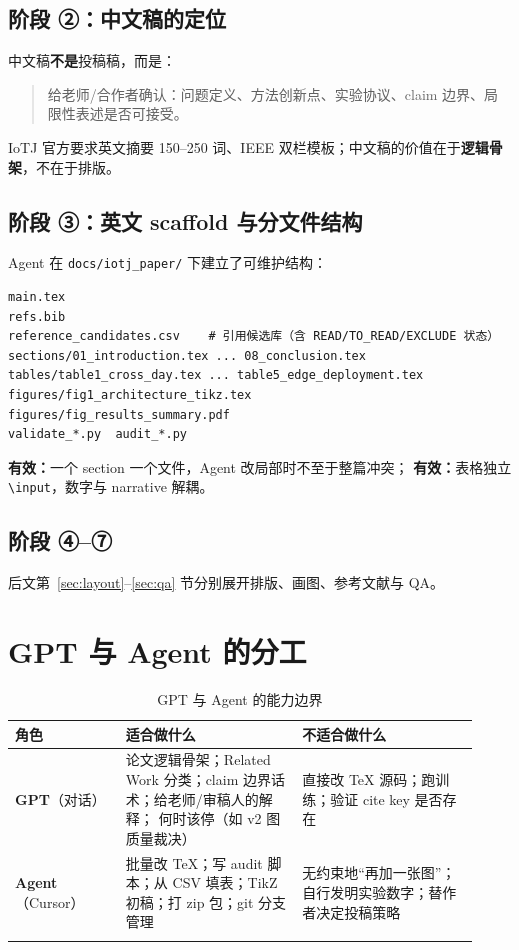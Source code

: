 \documentclass[11pt,a4paper]{ctexart}
\newcommand{\paperdir}{\texttt{docs/iotj\_paper/}}
\newcommand{\agent}{\textbf{Agent}}
\newcommand{\gpt}{\textbf{GPT}}
\newcommand{\good}[1]{\textcolor{green!50!black}{\textbf{有效：}#1}}
\begin{document}
\subsection{阶段 ②：中文稿的定位}
中文稿\textbf{不是}投稿稿，而是：
\begin{quote}
  给老师/合作者确认：问题定义、方法创新点、实验协议、claim 边界、局限性表述是否可接受。
\end{quote}
IoTJ 官方要求英文摘要 150--250 词、IEEE 双栏模板；中文稿的价值在于\textbf{逻辑骨架}，不在于排版。

\subsection{阶段 ③：英文 scaffold 与分文件结构}
Agent 在 \paperdir{} 下建立了可维护结构：
\begin{verbatim}
main.tex
refs.bib
reference_candidates.csv    # 引用候选库（含 READ/TO_READ/EXCLUDE 状态）
sections/01_introduction.tex ... 08_conclusion.tex
tables/table1_cross_day.tex ... table5_edge_deployment.tex
figures/fig1_architecture_tikz.tex
figures/fig_results_summary.pdf
validate_*.py  audit_*.py
\end{verbatim}

\good{一个 section 一个文件}，Agent 改局部时不至于整篇冲突；
\good{表格独立 \texttt{\textbackslash input}}，数字与 narrative 解耦。

\subsection{阶段 ④--⑦}
后文第~\ref{sec:layout}--\ref{sec:qa} 节分别展开排版、画图、参考文献与 QA。

\section{GPT 与 Agent 的分工}

\begin{longtable}{@{}p{0.22\linewidth}p{0.35\linewidth}p{0.35\linewidth}@{}}
  \toprule
  \textbf{角色} & \textbf{适合做什么} & \textbf{不适合做什么} \\
  \midrule
  \endhead
  \gpt{}（对话） &
  论文逻辑骨架；Related Work 分类；claim 边界话术；给老师/审稿人的解释；
  何时该停（如 v2 图质量裁决） &
  直接改 TeX 源码；跑训练；验证 cite key 是否存在 \\
  \agent{}（Cursor） &
  批量改 TeX；写 audit 脚本；从 CSV 填表；TikZ 初稿；打 zip 包；git 分支管理 &
  无约束地``再加一张图''；自行发明实验数字；替作者决定投稿策略 \\
  \bottomrule
  \caption{GPT 与 Agent 的能力边界}
\end{longtable}
\end{document}
